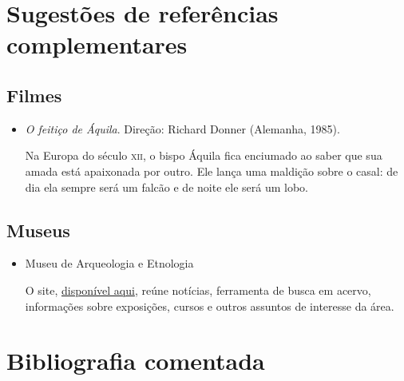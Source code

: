\documentclass[12pt]{extarticle}
\begin{document}
\section{Sugestões de referências complementares}\label{sugestoes}

\subsection{Filmes}

\begin{itemize}

\item \emph{O feitiço de Áquila}. Direção: Richard Donner (Alemanha, 1985).

Na Europa do século \textsc{xii}, o bispo Áquila fica enciumado ao saber que sua
amada está apaixonada por outro. Ele lança uma maldição sobre o casal:
de dia ela sempre será um falcão e de noite ele será um lobo.
\end{itemize}

\subsection{Museus}

\begin{itemize}
\item Museu de Arqueologia e Etnologia

O site, \href{http://mae.usp.br}{disponível aqui}, reúne notícias, 
ferramenta de busca em acervo, informações sobre
exposições, cursos e outros assuntos de interesse da área.
\end{itemize}

\section{Bibliografia comentada}
\end{document}
